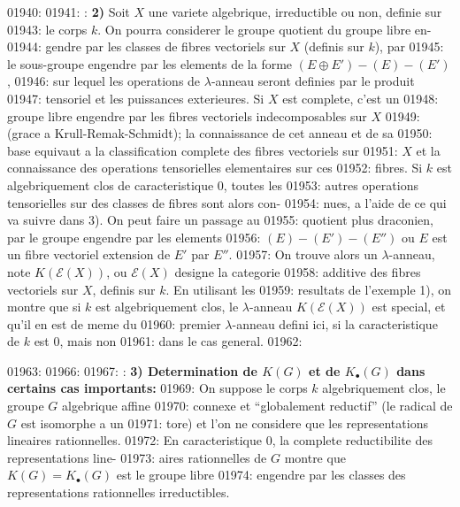 01940: 
01941: : \textbf{2)} Soit $X$ une variete algebrique, irreductible ou non, definie sur
01943: le corps $k$. On pourra considerer le groupe quotient du groupe libre en-
01944: gendre par les classes de fibres vectoriels sur $X$ (definis sur $k$), par
01945: le sous-groupe engendre par les elements de la forme $(E \oplus E') - (E) - (E')$,
01946: sur lequel les operations de $\lambda$-anneau seront definies par le produit
01947: tensoriel et les puissances exterieures. Si $X$ est complete, c'est un
01948: groupe libre engendre par les fibres vectoriels indecomposables sur $X$
01949: (grace a Krull-Remak-Schmidt); la connaissance de cet anneau et de sa
01950: base equivaut a la classification complete des fibres vectoriels sur
01951: $X$ et la connaissance des operations tensorielles elementaires sur ces
01952: fibres. Si $k$ est algebriquement clos de caracteristique 0, toutes les
01953: autres operations tensorielles sur des classes de fibres sont alors con-
01954: nues, a l'aide de ce qui va suivre dans 3). On peut faire un passage au
01955: quotient plus draconien, par le groupe engendre par les elements
01956: $(E) - (E') - (E'')$ ou $E$ est un fibre vectoriel extension de $E'$ par $E''$.
01957: On trouve alors un $\lambda$-anneau, note $K(\mathcal{E}(X))$, ou $\mathcal{E}(X)$ designe la categorie
01958: additive des fibres vectoriels sur $X$, definis sur $k$. En utilisant les
01959: resultats de l'exemple 1), on montre que si $k$ est algebriquement clos\footnotemark[2], le $\lambda$-anneau $K(\mathcal{E}(X))$ est special, et qu'il en est de meme du
01960: premier $\lambda$-anneau defini ici, si la caracteristique de $k$ est 0, mais non
01961: dans le cas general.
01962: \addtocounter{footnote}{1}
01963: 
01966: 
01967: : \textbf{3) Determination de $K(G)$ et de $K_{\bullet}(G)$ dans certains cas importants:}
01969: On suppose le corps $k$ algebriquement clos, le groupe $G$ algebrique affine
01970: connexe et ``globalement reductif'' (le radical de $G$ est isomorphe a un
01971: tore) et l'on ne considere que les representations lineaires rationnelles.
01972: En caracteristique 0, la complete reductibilite des representations line-
01973: aires rationnelles de $G$ montre que $K(G) = K_{\bullet}(G)$ est le groupe libre
01974: engendre par les classes des representations rationnelles irreductibles.
